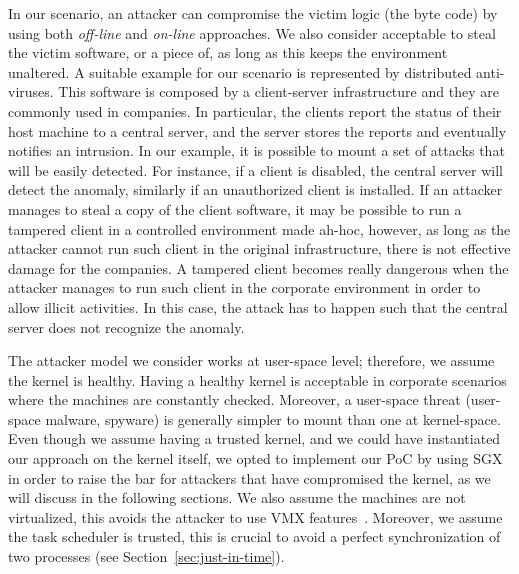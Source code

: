 In our scenario, an attacker can compromise the victim logic (\ie the byte code) 
by using both \emph{off-line} and \emph{on-line} approaches.
We also consider acceptable to steal the victim software, or a piece of, as 
long as this keeps the environment unaltered.
A suitable example for our scenario is represented by distributed anti-viruses. 
This software is composed by a client-server infrastructure and they are 
commonly used in companies. 
In particular, the clients report the status of their host machine to a central 
server, and the server stores the reports and eventually notifies an intrusion.
In our example, it is possible to mount a set of attacks that will be easily 
detected.
For instance, if a client is disabled, the central server will detect the 
anomaly, similarly if an unauthorized client is installed.
If an attacker manages to steal a copy of the client software, it may be 
possible to run a tampered client in a controlled environment made ah-hoc, 
however, as long as the attacker cannot run such client in the original 
infrastructure, there is not effective damage for the companies.
A tampered client becomes really dangerous when the attacker manages to run 
such client in the corporate environment in order to 
allow illicit activities. In this case, the attack has to happen such that the 
central server does not recognize the anomaly.

The attacker model we consider works at user-space level; therefore, we assume 
the kernel is healthy.
Having a healthy kernel is acceptable in corporate scenarios where the machines 
are constantly checked.
Moreover, a user-space threat (\eg user-space malware, spyware) is generally 
simpler to mount than one at kernel-space.
Even though we assume having a trusted kernel, and we could have  instantiated 
our approach on the kernel itself, we opted to implement our PoC by using SGX 
in order to raise the bar for attackers that have compromised the kernel, as we 
will discuss in the following sections.
We also assume the machines are not virtualized, this avoids the attacker to 
use VMX features~\citep{uhlig2005intel}.
Moreover, we assume the task scheduler is trusted, this is crucial to avoid a 
perfect synchronization of two processes (see Section~\ref{sec:just-in-time}).

